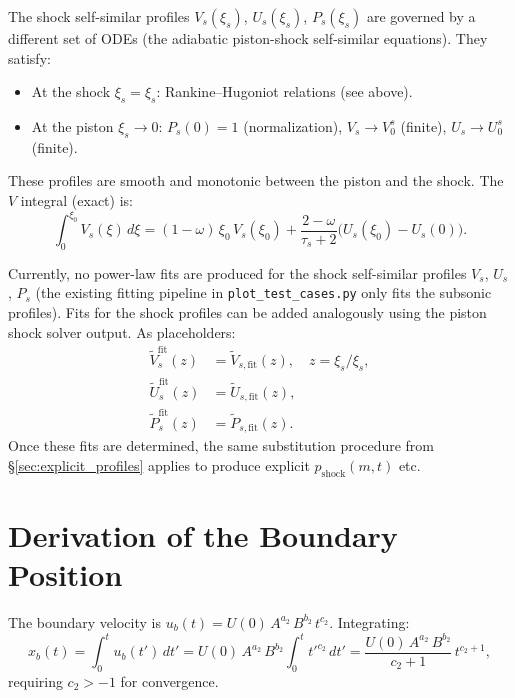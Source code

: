 \documentclass[11pt]{article}
\newcommand{\xsi}{\xi}
\newcommand{\xsis}{\xi_s}
\begin{document}
The shock self-similar profiles $V_s(\xsi_s)$, $U_s(\xsi_s)$, $P_s(\xsi_s)$ are governed by a different set of ODEs (the adiabatic piston-shock self-similar equations). They satisfy:
\begin{itemize}
  \item At the shock $\xsi_s = \xsis$: Rankine--Hugoniot relations (see above).
  \item At the piston $\xsi_s \to 0$: $P_s(0) = 1$ (normalization), $V_s \to V_0^s$ (finite), $U_s \to U_0^s$ (finite).
\end{itemize}

These profiles are smooth and monotonic between the piston and the shock. The $V$ integral (exact) is:
\begin{equation}
  \int_0^{\xsi_0} V_s(\xsi)\,d\xsi = (1-\omega)\,\xsi_0\,V_s(\xsi_0) + \frac{2-\omega}{\tau_s+2}\bigl(U_s(\xsi_0) - U_s(0)\bigr).
\end{equation}

\begin{notebox}
Currently, no power-law fits are produced for the shock self-similar profiles $V_s$, $U_s$, $P_s$ (the existing fitting pipeline in \texttt{plot\_test\_cases.py} only fits the subsonic profiles). Fits for the shock profiles can be added analogously using the piston shock solver output. As placeholders:
\begin{align}
  \tilde{V}_s^{\mathrm{fit}}(z) &= \tilde{V}_{s,\mathrm{fit}}(z), \quad z = \xsi_s/\xsis, \\
  \tilde{U}_s^{\mathrm{fit}}(z) &= \tilde{U}_{s,\mathrm{fit}}(z), \\
  \tilde{P}_s^{\mathrm{fit}}(z) &= \tilde{P}_{s,\mathrm{fit}}(z).
\end{align}
Once these fits are determined, the same substitution procedure from \S\ref{sec:explicit_profiles} applies to produce explicit $p_{\mathrm{shock}}(m,t)$ etc.
\end{notebox}


\appendix
\section{Derivation of the Boundary Position}
\label{app:boundary}

The boundary velocity is $u_b(t) = U(0)\,A^{a_2}\,B^{b_2}\,t^{c_2}$. Integrating:
\begin{equation}
  x_b(t) = \int_0^t u_b(t')\,dt' = U(0)\,A^{a_2}\,B^{b_2}\int_0^t t'^{c_2}\,dt'
  = \frac{U(0)\,A^{a_2}\,B^{b_2}}{c_2+1}\,t^{c_2+1},
\end{equation}
requiring $c_2 > -1$ for convergence.
\end{document}
